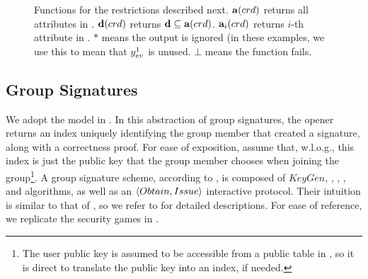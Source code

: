 \begin{figure}[ht!]
  \caption{Functions for the \CUASGen restrictions described next.
    $\mathbf{a}(crd)$ returns all attributes in \cred. $\mathbf{d}(crd)$ returns
    $\mathbf{d} \subseteq \mathbf{a}(crd)$. $\mathbf{a}_i(crd)$ returns $i$-th
    attribute in \cred. $\ast$ means the output is ignored (in these examples,
    we use this to mean that $y_{ev}^1$ is unused. $\bot$ means the function
    fails.}
  \label{fig:func-restrictions}
\end{figure}

\subsection{Group Signatures}
\label{ssec:related-models-gs}

We adopt the model in \cite{bsz05}. In this abstraction
of group signatures, the opener returns an index uniquely identifying the group
member that created a signature, along with a correctness proof. For ease of
exposition, assume that, w.l.o.g., this index is just the public key that the
group member chooses when joining the group\footnote{The user public key is
  assumed to be accessible from a public table in \cite{bsz05}, so it is direct
  to translate the public key into an index, if needed.}. A group signature
scheme, according to \cite{bsz05}, is composed of $KeyGen$, \UKeyGen, \Sign,
\Verify, \Open and \Judge algorithms, as well as an $\langle Obtain,Issue
\rangle$ interactive protocol. Their intuition is similar to that of
\UAS, so we refer to \cite{bsz05} for detailed descriptions. For ease of
reference, we replicate the security games in .

